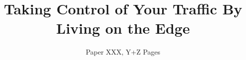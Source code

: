 \documentclass[letterpaper,twocolumn,10pt]{article}
\begin{document}
\setlength{\droptitle}{-1.5cm}

\title{\LARGE Taking Control of Your Traffic By Living on the Edge}
\author{Paper XXX, Y+Z Pages}

\date{\vspace{-12mm}}

\maketitle

\begin{sloppypar}











\end{sloppypar}
\label{p:end}
\clearpage


\end{document}
